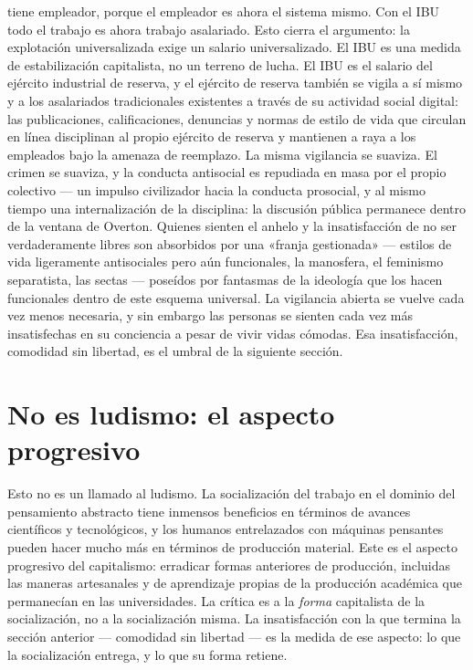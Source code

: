 \documentclass[11pt]{article}
\begin{document}
tiene empleador, porque el empleador es ahora el sistema mismo. Con el
IBU todo el trabajo es ahora trabajo asalariado. Esto cierra el
argumento: la explotación universalizada exige un salario
universalizado. El IBU es una medida de estabilización capitalista, no
un terreno de lucha. El IBU es el salario del ejército industrial de
reserva, y el ejército de reserva también se vigila a sí mismo y a los
asalariados tradicionales existentes a través de su actividad social
digital: las publicaciones, calificaciones, denuncias y normas de
estilo de vida que circulan en línea disciplinan al propio ejército de
reserva y mantienen a raya a los empleados bajo la amenaza de reemplazo.
La misma vigilancia se suaviza. El crimen se suaviza, y la conducta
antisocial es repudiada en masa por el propio colectivo --- un impulso
civilizador hacia la conducta prosocial, y al mismo tiempo una
internalización de la disciplina: la discusión pública permanece dentro
de la ventana de Overton. Quienes sienten el anhelo y la insatisfacción
de no ser verdaderamente libres son absorbidos por una «franja
gestionada» --- estilos de vida ligeramente antisociales pero aún
funcionales, la manosfera, el feminismo separatista, las sectas ---
poseídos por fantasmas de la ideología que los hacen funcionales dentro
de este esquema universal. La vigilancia abierta se vuelve cada vez menos
necesaria, y sin embargo las personas se sienten cada vez más
insatisfechas en su conciencia a pesar de vivir vidas cómodas. Esa
insatisfacción, comodidad sin libertad, es el umbral de la siguiente
sección.

\section{No es ludismo: el aspecto progresivo}

Esto no es un llamado al ludismo. La socialización del trabajo en el
dominio del pensamiento abstracto tiene inmensos beneficios en términos
de avances científicos y tecnológicos, y los humanos entrelazados con
máquinas pensantes pueden hacer mucho más en términos de producción
material. Este es el aspecto progresivo del capitalismo: erradicar formas
anteriores de producción, incluidas las maneras artesanales y de
aprendizaje propias de la producción académica que permanecían en las
universidades. La crítica es a la \emph{forma} capitalista de la
socialización, no a la socialización misma. La insatisfacción con la
que termina la sección anterior --- comodidad sin libertad --- es la
medida de ese aspecto: lo que la socialización entrega, y lo que su
forma retiene.
\end{document}
